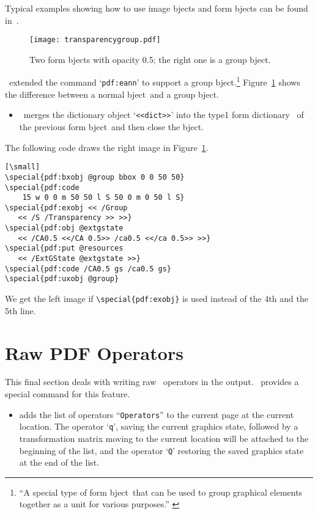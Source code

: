 \documentclass[final]{ltugboat}
\def\DPM{\acro{DVI\-PDFM}}
\let\DPX\DVIPDFMx
\def\XObject{\acro{XO}bject}
\let\note=\footnote
\begin{document}
\noindent
Typical examples showing how to use image \XObject{}s and form \XObject{}s can be found in~\cite[pp.~15--16]{Cho05}.

\begin{figure}[h]
\centering\texttt{[image: transparencygroup.pdf]}
\caption{Two form \XObject{}s with opacity 0.5; the right one is a group \XObject.}
\label{Figure1}
\end{figure}

\DPX\ extended the command `\texttt{pdf:eann}' to support a group \XObject.\note{``A special type of form \XObject\ that can be used to group graphical elements together as a unit for various purposes.'' \cite[p.~360]{PDFReference}}
Figure~\ref{Figure1} shows the difference between a normal \XObject\ and a group \XObject.

\begin{itemize}
\item{} \ merges the dictionary object `\texttt{<<dict>>}' into the type1 form dictionary~\cite[p.~358]{PDFReference} of the previous form \XObject\ and then close the \XObject.
\end{itemize}

\noindent
The following code draws the right image in Figure~\ref{Figure1}.

\begin{verbatim}[\small]
\special{pdf:bxobj @group bbox 0 0 50 50}
\special{pdf:code
    15 w 0 0 m 50 50 l S 50 0 m 0 50 l S}
\special{pdf:exobj << /Group
   << /S /Transparency >> >>}
\special{pdf:obj @extgstate
   << /CA0.5 <</CA 0.5>> /ca0.5 <</ca 0.5>> >>}
\special{pdf:put @resources
   << /ExtGState @extgstate >>}
\special{pdf:code /CA0.5 gs /ca0.5 gs}
\special{pdf:uxobj @group}
\end{verbatim}

\noindent We get the left image if \verb+\special{pdf:exobj}+ is used instead of the 4th and the 5th line.


\section{Raw PDF Operators}

This final section deals with writing raw \PDF\ operators in the output.
\DPM\ provides a special command for this feature.

\begin{itemize}
\item{} \vadjust{\vskip2pt} adds the list of operators ``\texttt{Operators}'' to the current page at the current location.
The operator `\texttt{q}', saving the current graphics state, followed by a transformation matrix moving to the current location will be attached to the beginning of the list, and the operator `\texttt{Q}' restoring the saved graphics state at the end of the list.
\end{itemize}
\end{document}
